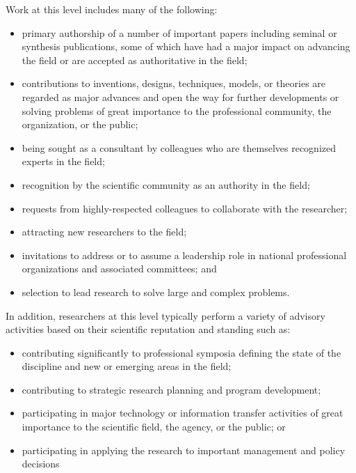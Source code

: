 Work at this level includes many of the following:
\begin{itemize}
  \item primary authorship of a number of important papers including seminal or synthesis  publications, some of which have had a major impact on advancing the field or are accepted as authoritative in the field;
  \item contributions to inventions, designs, techniques, models, or theories are regarded as major  advances and open the way for further developments or solving problems of great importance to the professional community, the organization, or the public;
  \item being sought as a consultant by colleagues who are themselves recognized experts in the  field;
  \item recognition by the scientific community as an authority in the field; 
  \item requests from highly-respected colleagues to collaborate with the researcher; 
  \item attracting new researchers to the field;
  \item invitations to address or to assume a leadership role in national professional organizations  and associated committees; and
  \item selection to lead research to solve large and complex problems.
\end{itemize}

In addition, researchers at this level typically perform a variety of
advisory activities based on their scientific reputation and standing
such as:

\begin{itemize}
  \item contributing significantly to professional symposia defining the
  state of the discipline and  new or emerging areas in the field;
  \item contributing to strategic research planning and program development;
  \item participating in major technology or information transfer activities of great importance to the scientific field, the agency, or the public; or
  \item participating in applying the research to important management and policy decisions
\end{itemize}

